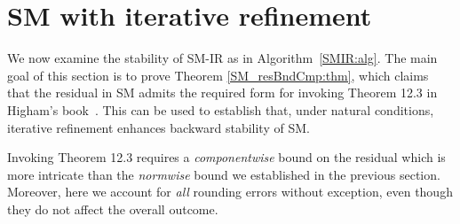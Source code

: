 \documentclass{siamltex}
\begin{document}
\section{SM with iterative refinement} 
We now examine the stability of SM-IR as in Algorithm~\ref{SMIR:alg}. The main goal of this section is to prove Theorem \ref{SM_resBndCmp:thm}, which claims that the residual in SM admits the required form for invoking Theorem 12.3 in Higham's book~\cite{Higham02}. This can be used to establish that, under natural conditions, iterative refinement enhances backward stability of SM.

Invoking Theorem 12.3 requires a {\em componentwise} bound on the residual which is more intricate than the {\em normwise} bound we established in the previous section. Moreover, here we account for {\em all} rounding errors without exception, even though they do not affect the overall outcome. 
\end{document}
